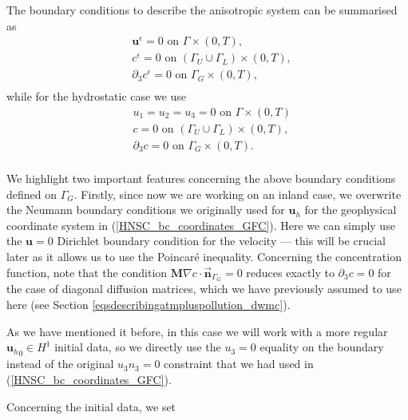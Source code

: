 \documentclass[12pt]{report}
\numberwithin{theorem}{chapter}
\numberwithin{corollary}{chapter}
\numberwithin{lemma}{chapter}
\numberwithin{remark}{chapter}
\numberwithin{definition}{chapter}
\numberwithin{prop}{chapter}
\begin{document}
The boundary conditions to describe the anisotropic system can be summarised as
%
    \begin{equation} \label{ANSC_bc-weak_coordinates_DWMC}
      \begin{split}
        & \mathbf{u}^\epsilon = 0 \text{ on } \Gamma \times (0,T), \\
        & c^\epsilon = 0 \text{ on } ( \Gamma_U \cup \Gamma_L) \times (0,T), \\
        & \partial_3 c^\epsilon = 0 \text{ on } \Gamma_G \times (0,T), \\
      \end{split}
    \end{equation}
while for the hydrostatic case we use
%
    \begin{equation} \label{HNSC_bc-weak_coordinates_DWMC}
      \begin{split} 
        & u_1 = u_2 = u_3 = 0 \text{ on } \Gamma \times (0,T) \\
        & c = 0 \text{ on } ( \Gamma_U \cup \Gamma_L) \times (0,T), \\
        & \partial_3 c = 0 \text{ on } \Gamma_G \times (0,T). \\
      \end{split}
    \end{equation}

We highlight two important features concerning the above boundary conditions defined on $\Gamma_G$. Firstly, since now we are working on an inland case, we overwrite the Neumann boundary conditions we originally used for $\mathbf{u}_h$ for the geophysical coordinate system in (\ref{HNSC_bc_coordinates_GFC}). Here we can simply use the $\mathbf{u}=0$ Dirichlet boundary condition for the velocity --- this will be crucial later as it allows us to use the Poincar\'e inequality. Concerning the concentration function, note that the condition $\mathbf{M} \nabla c \cdot \vec{\boldsymbol{n}}_{\Gamma_G} = 0$ reduces exactly to $\partial_3 c = 0$ for the case of diagonal diffusion matrices, which we have previously assumed to use here (see Section \ref{eqsdescribingatmpluspollution_dwmc}).

As we have mentioned it before, in this case we will work with a more regular ${\mathbf{u}_h}_0 \in H^1$ initial data, so we directly use the $u_3 = 0$ equality on the boundary instead of the original $u_3 n_3 = 0$ constraint that we had used in (\ref{HNSC_bc_coordinates_GFC}).

Concerning the initial data, we set
\end{document}
